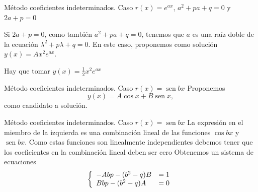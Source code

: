 \documentclass[handout,hyperref={colorlinks=true}]{beamer}
\DeclareMathOperator{\sen}{sen}
\begin{document}
 \begin{frame}{Método coeficientes indeterminados. Caso $r(x)=e^{a x}$, $a^2+pa+q= 0$ y $2a+p=0$}

 Si $2a+p=0$, como también $a^2+pa+q=0$, tenemos que $a$ es una raíz doble de la ecuación $\lambda^2+p\lambda+q=0$. 
 En este caso, proponemos como solución $y(x)=Ax^2e^{ax}$. 
 
 \lstI
 
 Hay que tomar $\boxed{y(x)=\frac{1}{2}x^2e^{ax}}$
 
 
\end{frame}
 
 
 
 \begin{frame}{Método coeficientes indeterminados. Caso $r(x)=\sen bx$}
 Proponemos 
 \[y(x)=A\cos x+ B\sen x,\]
 como candidato a solución. 
 
 \lstI
 
 
 
\end{frame}
 
 
 
 \begin{frame}{Método coeficientes indeterminados. Caso $r(x)=\sen bx$}
La expresión en el miembro de la izquierda es una combinación lineal de las funciones $\cos bx$ y $\sen bx$. Como estas funciones son linealmente independientes
debemos tener que los coeficientes en la combinación lineal deben ser cero
\lstI
Obtenemos un sistema de ecuaciones
\begin{equation}\label{sist_lin_1}
  \left\{\begin{array}{l l}
          -Abp - (b^2 - q)B & = 1\\
          Bbp - (b^2 - q)A &=0
         \end{array}
  \right.
\end{equation}
 
\end{frame}
\end{document}
